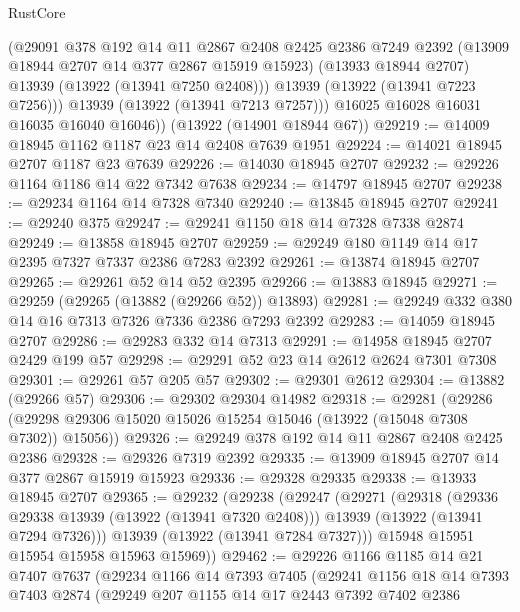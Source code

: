 \begin{lexlean}{RustCore}
\begin{coremodule}
            (@29091
              @378
              @192
              @14
              @11
              @2867
              @2408
              @2425
              @2386
              @7249
              @2392
              (@13909 @18944 @2707 @14 @377 @2867 @15919 @15923)
              (@13933 @18944 @2707)
              @13939
              (@13922 (@13941 @7250 @2408)))
            @13939
            (@13922 (@13941 @7223 @7256)))
          @13939
          (@13922 (@13941 @7213 @7257)))
        @16025
        @16028
        @16031
        @16035
        @16040
        @16046))
    (@13922 (@14901 @18944 @67))
@29219 := @14009 @18945 @1162 @1187 @23 @14 @2408 @7639 @1951
@29224 := @14021 @18945 @2707 @1187 @23 @7639
@29226 := @14030 @18945 @2707
@29232 := @29226 @1164 @1186 @14 @22 @7342 @7638
@29234 := @14797 @18945 @2707
@29238 := @29234 @1164 @14 @7328 @7340
@29240 := @13845 @18945 @2707
@29241 := @29240 @375
@29247 := @29241 @1150 @18 @14 @7328 @7338 @2874
@29249 := @13858 @18945 @2707
@29259 := @29249 @180 @1149 @14 @17 @2395 @7327 @7337 @2386 @7283 @2392
@29261 := @13874 @18945 @2707
@29265 := @29261 @52 @14 @52 @2395
@29266 := @13883 @18945
@29271 := @29259 (@29265 (@13882 (@29266 @52)) @13893)
@29281 := @29249 @332 @380 @14 @16 @7313 @7326 @7336 @2386 @7293 @2392
@29283 := @14059 @18945 @2707
@29286 := @29283 @332 @14 @7313
@29291 := @14958 @18945 @2707 @2429 @199 @57
@29298 := @29291 @52 @23 @14 @2612 @2624 @7301 @7308
@29301 := @29261 @57 @205 @57
@29302 := @29301 @2612
@29304 := @13882 (@29266 @57)
@29306 := @29302 @29304 @14982
@29318 := @29281
    (@29286 (@29298 @29306 @15020 @15026 @15254 @15046 (@13922 (@15048 @7308 @7302)) @15056))
@29326 := @29249 @378 @192 @14 @11 @2867 @2408 @2425 @2386
@29328 := @29326 @7319 @2392
@29335 := @13909 @18945 @2707 @14 @377 @2867 @15919 @15923
@29336 := @29328 @29335
@29338 := @13933 @18945 @2707
@29365 := @29232
    (@29238
      (@29247
        (@29271
          (@29318
            (@29336 @29338 @13939 (@13922 (@13941 @7320 @2408)))
            @13939
            (@13922 (@13941 @7294 @7326)))
          @13939
          (@13922 (@13941 @7284 @7327)))
        @15948
        @15951
        @15954
        @15958
        @15963
        @15969))
@29462 := @29226
    @1166
    @1185
    @14
    @21
    @7407
    @7637
    (@29234
      @1166
      @14
      @7393
      @7405
      (@29241
        @1156
        @18
        @14
        @7393
        @7403
        @2874
        (@29249
          @207
          @1155
          @14
          @17
          @2443
          @7392
          @7402
          @2386

\end{coremodule}
\end{lexlean}
